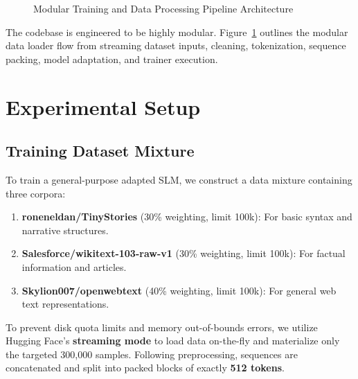 \documentclass[11pt,a4paper]{article}
\begin{document}
\begin{figure}[h!]
\caption{Modular Training and Data Processing Pipeline Architecture}
\label{fig:pipeline_architecture}
\end{figure}

The codebase is engineered to be highly modular. Figure~\ref{fig:pipeline_architecture} outlines the modular data loader flow from streaming dataset inputs, cleaning, tokenization, sequence packing, model adaptation, and trainer execution.

\section{Experimental Setup}
\subsection{Training Dataset Mixture}
To train a general-purpose adapted SLM, we construct a data mixture containing three corpora:
\begin{enumerate}
    \item \textbf{roneneldan/TinyStories} (30\% weighting, limit 100k): For basic syntax and narrative structures.
    \item \textbf{Salesforce/wikitext-103-raw-v1} (30\% weighting, limit 100k): For factual information and articles.
    \item \textbf{Skylion007/openwebtext} (40\% weighting, limit 100k): For general web text representations.
\end{enumerate}

To prevent disk quota limits and memory out-of-bounds errors, we utilize Hugging Face's \textbf{streaming mode} to load data on-the-fly and materialize only the targeted 300,000 samples. Following preprocessing, sequences are concatenated and split into packed blocks of exactly \textbf{512 tokens}.
\end{document}
